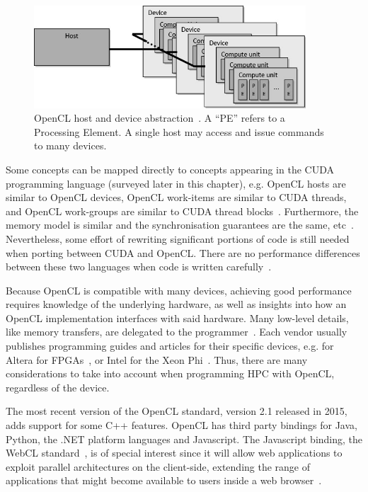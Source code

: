 \begin{figure}[!h]
\begin{center}
\centerline{\includegraphics[width=4in]{img/hostdev}}
\caption[OpenCL host and device abstraction.]{OpenCL host and device abstraction~\cite{gaster2012heterogeneous}. A ``PE'' refers to a Processing Element. A single host may access and issue commands to many devices.}
\label{f:hostdev}
\end{center}
\end{figure}

Some concepts can be mapped directly to concepts appearing in the CUDA programming language (surveyed later in this chapter), e.g. OpenCL hosts are similar to OpenCL devices, OpenCL work-items are similar to CUDA threads, and OpenCL work-groups are similar to CUDA thread blocks~\cite{7_amd_2011}. Furthermore, the memory model is similar and the synchronisation guarantees are the same, etc~\cite{7_amd_2011}. Nevertheless, some effort of rewriting significant portions of code is still needed when porting between CUDA and OpenCL. There are no performance differences between these two languages when code is written carefully~\cite{fang2011comprehensive}.


Because OpenCL is compatible with many devices, achieving good performance requires knowledge of the underlying hardware, as well as insights into how an OpenCL implementation interfaces with said hardware. Many low-level details, like memory transfers, are delegated to the programmer~\cite{augonnet2011starpu}. Each vendor usually publishes programming guides and articles for their specific devices, e.g. for Altera for FPGAs~\cite{singh2011implementing}, or Intel for the Xeon Phi~\cite{7_software.intel.com_2014}. Thus, there are many considerations to take into account when programming HPC with OpenCL, regardless of the device.


The most recent version of the OpenCL standard, version 2.1 released in 2015, adds support for some C++ features. OpenCL has third party bindings for Java, Python, the .NET platform languages and Javascript. The Javascript binding, the WebCL standard~\cite{aarnio2014webcl}, is of special interest since it will allow web applications to exploit parallel architectures on the client-side, extending the range of applications that might become available to users inside a web browser~\cite{herhut2012parallel}.

